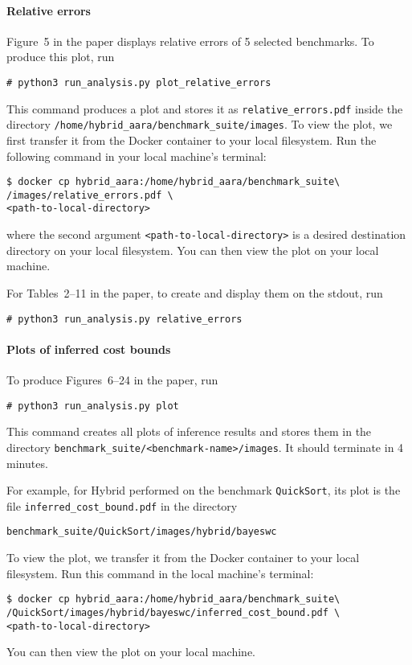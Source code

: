 \paragraph{Relative errors}

Figure~5 in the paper displays relative errors of 5 selected benchmarks.
%
To produce this plot, run
\begin{verbatim}
# python3 run_analysis.py plot_relative_errors
\end{verbatim}
%
This command produces a plot and stores it as
\texttt{relative\_errors.pdf} inside the directory
\texttt{/home/hybrid\_aara/benchmark\_suite/images}.
%
To view the plot, we first transfer it from the Docker container to your local
filesystem.
%
Run the following command in your local machine's terminal:
\begin{verbatim}
$ docker cp hybrid_aara:/home/hybrid_aara/benchmark_suite\
/images/relative_errors.pdf \
<path-to-local-directory>
\end{verbatim}
where the second argument \texttt{<path-to-local-directory>} is a desired
destination directory on your local filesystem.
%
You can then view the plot on your local machine.

For Tables~2--11 in the paper, to create and display them on the stdout, run
\begin{verbatim}
# python3 run_analysis.py relative_errors
\end{verbatim}

\paragraph{Plots of inferred cost bounds}

To produce Figures~6--24 in the paper, run
\begin{verbatim}
# python3 run_analysis.py plot
\end{verbatim}
%
This command creates all plots of inference results and stores them in the
directory \texttt{benchmark\_suite/<benchmark-name>/images}.
%
It should terminate in 4 minutes.

For example, for Hybrid \BayesWC{} performed on the benchmark
\texttt{QuickSort}, its plot is the file \texttt{inferred\_cost\_bound.pdf} in
the directory
\begin{verbatim}
benchmark_suite/QuickSort/images/hybrid/bayeswc
\end{verbatim}
%
To view the plot, we transfer it from the Docker container to your local
filesystem.
%
Run this command in the local machine's terminal:
\begin{verbatim}
$ docker cp hybrid_aara:/home/hybrid_aara/benchmark_suite\
/QuickSort/images/hybrid/bayeswc/inferred_cost_bound.pdf \
<path-to-local-directory>
\end{verbatim}
%
You can then view the plot on your local machine.

